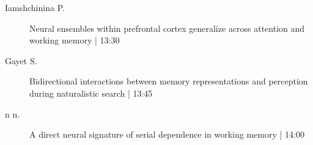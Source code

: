 \begin{symposium}
\begin{description}
                \item [ Iamshchinina P.] Neural ensembles within prefrontal cortex generalize across attention and working memory  \textcolor{mygray}{ | 13:30}    
                
                \item [ Gayet S.] Bidirectional interactions between memory representations and perception during naturalistic search \textcolor{mygray}{ | 13:45}    
                
                \item [n n.] A direct neural signature of serial dependence in working memory \textcolor{mygray}{ | 14:00}    
                
            \end{description} 
            \end{symposium}
            